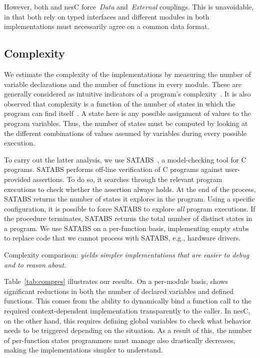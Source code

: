 However, both \conesc and nesC force~\emph{Data} and~\emph{External}
couplings. This is unavoidable, in that both rely on typed interfaces
and different modules in both implementations must necessarily agree
on a common data format.


\subsection{Complexity}\label{sec:complexity}

We estimate the complexity of the implementations by measuring the
number of variable declarations and the number of functions in every
module. These are generally considered as intuitive indicators of a
program's complexity~\cite{koopman10:better}. It is also observed that
complexity is a function of the number of states in which the program
can find itself~\cite{koopman10:better}. A state here is any possible
assignment of values to the program variables. Thus, the number of
states must be computed by looking at the different combinations of
values assumed by variables during every possible execution.

To carry out the latter analysis, we use
SATABS~\cite{clarke05:satabs}, a model-checking tool for C
programs. SATABS performs off-line verification of C programs against
user-provided assertions. To do so, it searches through the relevant
program executions to check whether the assertion always holds. At the
end of the process, SATABS returns the number of states it explores in
the program.  Using a specific configuration, it is possible to force
SATABS to explore \emph{all} program executions. If the procedure
terminates, SATABS returns the total number of distinct states in a
program. We use SATABS on a per-function basis, implementing empty
stubs to replace code that we cannot process with SATABS, e.g.,
hardware drivers.

\begin{table}[!tb]
\renewcommand{\arraystretch}{1.3}
\caption{Complexity comparison: \emph{\conesc yields simpler implementations that are easier to debug and to reason about.}}
\label{tab:compres}

\end{table}

 Table~\ref{tab:compres} illustrates our results. On
a per-module basis, \conesc shows significant reductions in both the
number of declared variables and defined functions. This comes from
the ability to dynamically bind a function call to the required
context-dependent implementation transparently to the caller. In nesC,
on the other hand, this requires defining global variables to check
what behavior needs to be triggered depending on the situation. As a
result of this, the number of per-function states programmers must
manage also drastically decreases, making the implementations simpler
to understand. %

